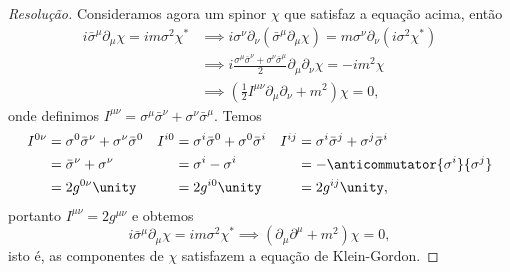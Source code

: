 \begin{proof}[Resolução]
    Consideramos agora um spinor \(\chi\) que satisfaz a equação acima, então
    \begin{align*}
        i \bar{\sigma}^\mu \partial_\mu \chi = i m \sigma^2 \chi^* 
        &\implies i \sigma^\nu \partial_\nu (\bar{\sigma}^\mu \partial_\mu \chi) = m \sigma^\nu \partial_\nu (i \sigma^2 \chi^*)\\
        &\implies i \frac{\sigma^\mu \bar{\sigma}^\nu + \sigma^\nu \bar{\sigma}^\mu}{2} \partial_\mu \partial_\nu \chi = -im^2\chi\\
        &\implies \left(\frac12I^{\mu\nu}\partial_\mu \partial_\nu + m^2\right)\chi = 0,
    \end{align*}
    onde definimos \(I^{\mu\nu} = \sigma^\mu \bar{\sigma}^\nu + \sigma^\nu \bar{\sigma}^\mu.\) Temos
    \begin{align*}
        I^{0\nu} &= \sigma^0 \bar{\sigma}^\nu + \sigma^\nu \bar{\sigma}^0&
        I^{i0}   &= \sigma^i \bar{\sigma}^0 + \sigma^0 \bar{\sigma}^i&
        I^{ij}   &= \sigma^i \bar{\sigma}^j + \sigma^j \bar{\sigma}^i\\
                 &= \bar{\sigma}^\nu + \sigma^\nu&
                 &= \sigma^i - \sigma^i&
                 &= -\anticommutator{\sigma^i}{\sigma^j}\\
                 &= 2 g^{0\nu} \unity&
                 &= 2 g^{i0} \unity&
                 &= 2 g^{ij} \unity,
    \end{align*}
    portanto \(I^{\mu\nu} = 2g^{\mu\nu}\) e obtemos
    \begin{equation*}
        i \bar{\sigma}^\mu \partial_\mu \chi = im \sigma^2 \chi^* \implies (\partial_\mu \partial^\mu + m^2)\chi = 0,
    \end{equation*}
    isto é, as componentes de \(\chi\) satisfazem a equação de Klein-Gordon.


\end{proof}
